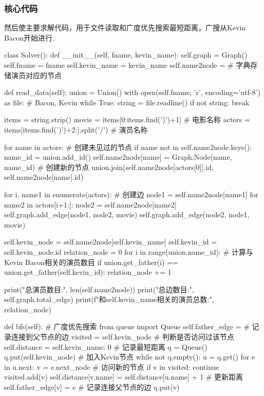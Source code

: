 \documentclass[12pt, a4paper, oneside]{ctexart}
\numberwithin{equation}{section}  %
\begin{document}
\subsubsection{核心代码}
然后使主要求解代码，用于文件读取和广度优先搜索最短距离，广搜从Kevin Bacon开始进行.
\begin{pythoncode}
class Solver():
    def __init__(self, fname, kevin_name):
        self.graph = Graph()
        self.fname = fname
        self.kevin_name = kevin_name
        self.name2node = {}  # 字典存储演员对应的节点

    def read_data(self):
        union = Union()
        with open(self.fname, 'r', encoding='utf-8') as file:  # Bacon, Kevin
            while True:
                string = file.readline()
                if not string: break

                items = string.strip()
                movie = items[0:items.find(')')+1]  # 电影名称
                actors = items[items.find(')')+2:].split('/')  # 演员名称

                for name in actors:  # 创建未见过的节点
                    if name not in self.name2node.keys():
                        name_id = union.add_id()
                        self.name2node[name] = Graph.Node(name, name_id)  # 创建新的节点
                    union.join(self.name2node[actors[0]].id, self.name2node[name].id)

                for i, name1 in enumerate(actors):  # 创建边
                    node1 = self.name2node[name1]
                    for name2 in actors[i+1:]:
                        node2 = self.name2node[name2]
                        self.graph.add_edge(node1, node2, movie)
                        self.graph.add_edge(node2, node1, movie)
            
        self.kevin_node = self.name2node[self.kevin_name]
        self.kevin_id = self.kevin_node.id
        relation_node = 0
        for i in range(union.name_id):  # 计算与Kevin Bacon相关的演员数目
            if union.get_father(i) == union.get_father(self.kevin_id):
                relation_node += 1

        print("总演员数目:", len(self.name2node))
        print("总边数目:", self.graph.total_edge)
        print(f"和{self.kevin_name}相关的演员总数:", relation_node)

    def bfs(self):  # 广度优先搜索
        from queue import Queue
        self.father_edge = {}  # 记录连接到父节点的边
        visited = {self.kevin_node}  # 判断是否访问过该节点
        self.distance = {self.kevin_name: 0}  # 记录最短距离
        q = Queue()
        q.put(self.kevin_node)  # 加入Kevin节点
        while not q.empty():
            u = q.get()
            for e in u.next:
                v = e.next_node  # 访问新的节点
                if v in visited: continue
                visited.add(v)
                self.distance[v.name] = self.distance[u.name] + 1  # 更新距离
                self.father_edge[v] = e  # 记录连接父节点的边
                q.put(v)
    

\end{pythoncode}
\end{document}
